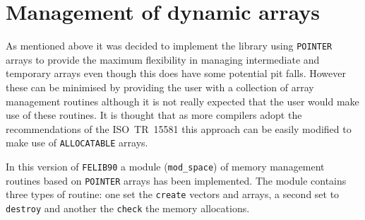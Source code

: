 \documentclass[a4paper,titlepage,11pt]{article}
\begin{document}
\section{Management of dynamic arrays}
As mentioned above it was decided to implement the library
using {\tt POINTER} arrays to provide the maximum flexibility
in managing intermediate and temporary arrays even though this does have some potential
pit falls. However these can be minimised by providing the user with a collection
of array management routines although it is not really expected that the
user would make use of these routines. It is thought that as more compilers adopt the 
recommendations of the ISO~TR~15581 this approach can be easily modified to make
use of {\tt ALLOCATABLE} arrays.

In this version of {\tt FELIB90} a module ({\tt mod\_space}) of memory management 
routines based on {\tt POINTER} arrays has been implemented. The module
contains three types of routine: one set the {\tt create} vectors and arrays,
a second set to {\tt destroy} and another the {\tt check} the memory
allocations.
\end{document}
